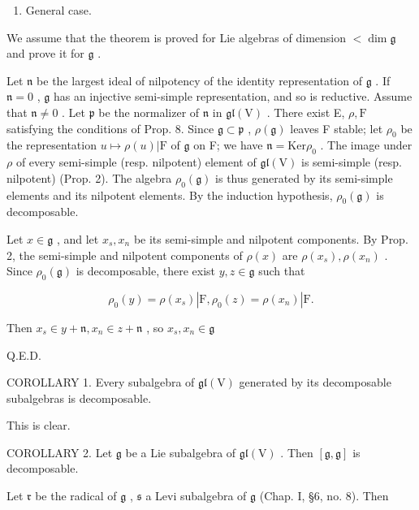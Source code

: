 \begin{enumerate}
\def\labelenumi{\alph{enumi})}
\setcounter{enumi}{2}
\tightlist
\item
  General case.
\end{enumerate}

We assume that the theorem is proved for Lie algebras of dimension \(< \dim \mathfrak{g}\) and prove it for \(\mathfrak{g}\) .

Let \(\mathfrak{n}\) be the largest ideal of nilpotency of the identity representation of \(\mathfrak{g}\) . If \(\mathfrak{n} = 0\) , \(\mathfrak{g}\) has an injective semi-simple representation, and so is reductive. Assume that \(\mathfrak{n} \neq 0\) . Let \(\mathfrak{p}\) be the normalizer of \(\mathfrak{n}\) in \(\mathfrak{gl}(\mathrm{V})\) . There exist E, \(\rho, \mathrm{F}\) satisfying the conditions of Prop. 8. Since \(\mathfrak{g} \subset \mathfrak{p}\) , \(\rho(\mathfrak{g})\) leaves F stable; let \(\rho_0\) be the representation \(u \mapsto \rho(u)|\mathrm{F}\) of \(\mathfrak{g}\) on F; we have \(\mathfrak{n} = \mathrm{Ker}\rho_0\) . The image under \(\rho\) of every semi-simple (resp. nilpotent) element of \(\mathfrak{gl}(\mathrm{V})\) is semi-simple (resp. nilpotent) (Prop. 2). The algebra \(\rho_0(\mathfrak{g})\) is thus generated by its semi-simple elements and its nilpotent elements. By the induction hypothesis, \(\rho_0(\mathfrak{g})\) is decomposable.

Let \(x \in \mathfrak{g}\) , and let \(x_s, x_n\) be its semi-simple and nilpotent components. By Prop. 2, the semi-simple and nilpotent components of \(\rho(x)\) are \(\rho(x_s), \rho(x_n)\) . Since \(\rho_0(\mathfrak{g})\) is decomposable, there exist \(y, z \in \mathfrak{g}\) such that

\[
\rho_ {0} (y) = \rho (x _ {s}) | \mathrm{F}, \rho_ {0} (z) = \rho (x _ {n}) | \mathrm{F}.
\]

Then \(x_{s}\in y + \mathfrak{n},x_{n}\in z + \mathfrak{n}\) , so \(x_{s},x_{n}\in \mathfrak{g}\)

Q.E.D.

COROLLARY 1. Every subalgebra of \(\mathfrak{gl}(\mathrm{V})\) generated by its decomposable subalgebras is decomposable.

This is clear.

COROLLARY 2. Let \(\mathfrak{g}\) be a Lie subalgebra of \(\mathfrak{gl}(\mathrm{V})\) . Then \([\mathfrak{g},\mathfrak{g}]\) is decomposable.

Let \(\mathfrak{r}\) be the radical of \(\mathfrak{g}\) , \(\mathfrak{s}\) a Levi subalgebra of \(\mathfrak{g}\) (Chap. I, §6, no. 8). Then

